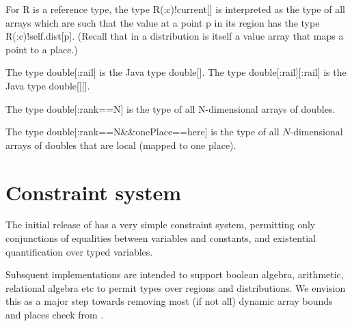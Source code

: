 For {\cf R} is a reference type, the type {\cf R(:c)!current[]} is interpreted as the
type of all arrays which are such that the value at a point {\cf p} in its
region has the type {\cf R(:c)!self.dist[p]}. (Recall that in \Xten{} a
distribution is itself a value array that maps a point to a place.)

\begin{example}
  The type {\cf double[:rail]} is the Java type {\cf double[]}.
  The type {\cf double[:rail][:rail]} is the Java type {\cf double[][]}.

  The type {\cf double[:rank==N]} is the type of all N-dimensional arrays of
  doubles.

  The type {\cf double[:rank==N\&\&onePlace==here]} is the type of all $N$-dimensional
  arrays of doubles that are local (mapped to one place).  
\end{example}

\section{Constraint system}

The initial release of \Xten{} has a very simple constraint system,
permitting only conjunctions of equalities between variables and
constants, and existential quantification over typed variables.

Subsquent implementations are intended to support boolean algebra,
arithmetic, relational algebra etc to permit types over regions and
distributions. We envision this as a major step towards removing most
(if not all) dynamic array bounds and places check from \Xten{}.
  

